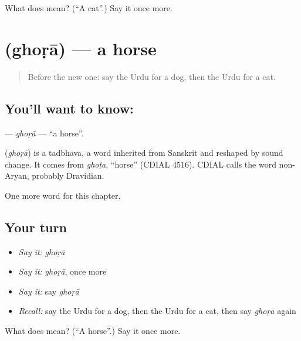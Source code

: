 \begin{tcolorbox}[breakable,colback=teal!4,colframe=teal!35!black,title={Before you move on}]
What does  mean? (\textquotedblleft{}A cat\textquotedblright{}.) Say it once more.
\end{tcolorbox}
\section[\texorpdfstring{\ur{گھوڑا} (ghoṛā)}{گھوڑا (ghoṛā)}]{ (ghoṛā) — a horse}

\label{lesson:UR-C67-ghora}



\begin{quote}
Before the new one: say the Urdu for a dog, then the Urdu for a cat.
\end{quote}

\subsection*{You'll want to know: }
\textbf{} — \emph{ghoṛā} — \textquotedblleft{}a horse\textquotedblright{}.

\begin{cousinweb}
\textbf{} (\emph{ghoṛā}) is a tadbhava, a word inherited from Sanskrit and reshaped by sound change. It comes from \emph{ghoṭa}, \textquotedblleft{}horse\textquotedblright{} (CDIAL 4516). CDIAL calls the word non-Aryan, probably Dravidian.
\end{cousinweb}

\begin{grammarlens}[title={What you've built}]
One more word for this chapter.
\end{grammarlens}

\subsection*{Your turn}
\begin{itemize}
\raggedright
  \item \emph{Say it:} \emph{ghoṛā}
  \item \emph{Say it:} \emph{ghoṛā}, once more
  \item \emph{Say it:} say \emph{ghoṛā}
  \item \emph{Recall:} say the Urdu for a dog, then the Urdu for a cat, then say \emph{ghoṛā} again
\end{itemize}

\begin{tcolorbox}[breakable,colback=teal!4,colframe=teal!35!black,title={Before you move on}]
What does  mean? (\textquotedblleft{}A horse\textquotedblright{}.) Say it once more.
\end{tcolorbox}
